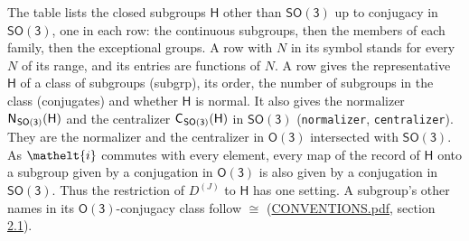 \documentclass[10pt,a4paper]{article}
\numberwithin{equation}{section}
\newcommand{\eltfont}[1]{{\let\sigma\eltsigma\mathelt{#1}}}
\newcommand{\grp}[1]{\mathsf{#1}}
\newcommand{\elt}[1]{\eltfont{#1}}
\newcommand{\samecls}{\cong}
\newcommand{\irrJ}[1]{D^{(#1)}}
\newcommand{\hairsp}{\mkern1mu}
\begin{document}
\leavevmode\label{n:group.H}The table lists the closed subgroups $\grp{H}$ other than $\grp{SO(3)}$ up to conjugacy in $\grp{SO(3)}$, one in each row: the continuous subgroups, then the members of each family, then the exceptional groups. A row with $N$ in its symbol stands for every $N$ of its range, and its entries are functions of $N$. \label{n:head.subgroup}\label{n:head.order}\label{n:head.conjugates}\label{n:head.normal}A row gives the representative $\grp{H}$ of a class of subgroups (subgrp), its order, the number of subgroups in the class (conjugates) and whether $\grp{H}$ is normal. \label{n:group.normalizer}\label{n:group.centralizer}It also gives the normalizer $\grp{N}_{\hairsp \grp{SO(3)}}(\grp{H})$ and the centralizer $\grp{C}_{\hairsp \grp{SO(3)}}(\grp{H})$ in $\grp{SO(3)}$ (\texttt{normalizer}, \texttt{centralizer}). They are the normalizer and the centralizer in \href{O3.pdf}{$\grp{O(3)}$} intersected with $\grp{SO(3)}$. As $\elt{i}$ commutes with every element, every map of the record of $\grp{H}$ onto a subgroup given by a conjugation in \href{O3.pdf}{$\grp{O(3)}$} is also given by a conjugation in $\grp{SO(3)}$. Thus the restriction of $\irrJ{J}$ to $\grp{H}$ has one setting. A subgroup's other names in its \href{O3.pdf}{$\grp{O(3)}$}-conjugacy class follow $\samecls$ (\href{../../CONVENTIONS.pdf}{CONVENTIONS.pdf}, section \href{../../CONVENTIONS.pdf\#conv.2.1}{2.1}).
\end{document}
